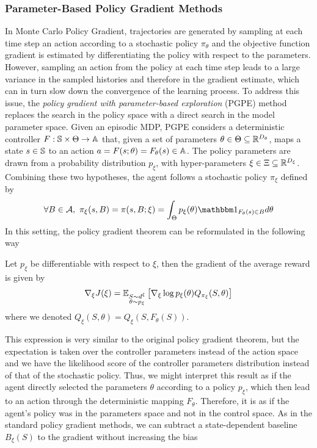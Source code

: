 \subsubsection{Parameter-Based Policy Gradient Methods}
In Monte Carlo Policy Gradient, trajectories are generated by sampling at each
time step an action according to a stochastic policy $\pi_\theta$ and the
objective function gradient is estimated by differentiating the policy with
respect to the parameters. However, sampling an action from the policy at each
time step leads to a large variance in the sampled histories and therefore in 
the gradient estimate, which can in turn slow down the convergence of the
learning process. To address this issue, the \emph{policy gradient with parameter-based exploration} (PGPE) method \cite{sehnke2008policy} replaces the search in the policy space with a direct search in the model parameter space. Given an episodic MDP, PGPE considers a deterministic controller $F: \S \times \Theta \to \A$ that, given a set of parameters $\theta \in \Theta \subseteq \R^{D_\theta}$, maps a state $s \in \S$ to an action $a = F(s; \theta) = F_\theta(s) \in \A$. The policy parameters are drawn from a probability distribution $p_\xi$, with hyper-parameters $\xi \in \Xi \subseteq \R^{D_\xi}$. Combining these two hypotheses, the agent follows a stochastic policy $\pi_\xi$ defined by
\begin{equation}
	\forall B \in \calA ,\ \pi_\xi(s,B) = \pi(s, B; \xi) = \int_\Theta p_\xi(\theta) 
	\ind{F_{\theta}(s)\in B} d\theta
\end{equation}
In this setting, the policy gradient theorem can be reformulated in the following way 
\begin{theorem}
	Let $p_\xi$ be differentiable with respect to $\xi$, then the gradient of the average reward is given by
	\begin{equation}
		\nabla_\xi J(\xi) = \E[\substack{S \sim d^\xi\\\theta \sim p_\xi}]{\nabla_\xi \log p_\xi(\theta) Q_{\pi_\xi}(S, \theta)}
	\end{equation}
	where we denoted $Q_\xi(S, \theta) = Q_\xi(S, F_\theta(S))$.
\end{theorem}
This expression is very similar to the original policy gradient theorem, but
the expectation is taken over the controller parameters instead of the action space and we have the likelihood score of the controller parameters distribution instead of that of the stochastic policy. Thus, we might interpret this result as if the agent directly selected the parameters $\theta$ according to a policy $p_\xi$, which then lead to an action through the deterministic mapping $F_\theta$. Therefore, it is as if the agent's policy was in the parameters space and not in the control space. As in the standard policy gradient methods, we can subtract a state-dependent baseline $B_\xi(S)$ to the gradient without increasing the bias

